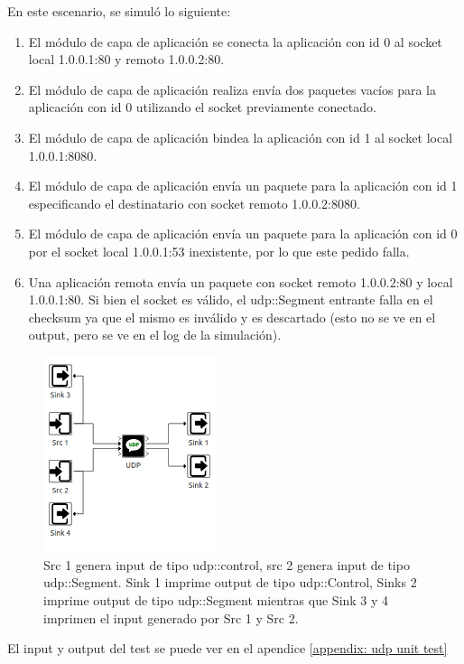 \documentclass[10pt,a4paper]{article}
\begin{document}
En este escenario, se simuló lo siguiente:
\begin{enumerate}
\item El módulo de capa de aplicación se conecta la aplicación con id 0 al socket local 1.0.0.1:80 y remoto 1.0.0.2:80.
\item El módulo de capa de aplicación realiza envía dos paquetes vacíos para la aplicación con id 0 utilizando el socket previamente conectado.
\item El módulo de capa de aplicación bindea la aplicación con id 1 al socket local 1.0.0.1:8080.
\item El módulo de capa de aplicación envía un paquete para la aplicación con id 1 especificando el destinatario con socket remoto 1.0.0.2:8080.
\item El módulo de capa de aplicación envía un paquete para la aplicación con id 0 por el socket local 1.0.0.1:53 inexistente, por lo que este pedido falla.
\item Una aplicación remota envía un paquete con socket remoto 1.0.0.2:80 y local 1.0.0.1:80. Si bien el socket es válido, el udp::Segment entrante falla en el checksum ya que el mismo es inválido y es descartado (esto no se ve en el output, pero se ve en el log de la simulación).
\end{enumerate}

\begin{figure}[!h]
    \centering
    \includegraphics[width = 0.45\textwidth]{img/png/unit_tests/udp.png}
    \caption{Src 1 genera input de tipo udp::control, src 2 genera input de tipo udp::Segment. Sink 1 imprime output de tipo udp::Control, Sinks 2 imprime output de tipo udp::Segment mientras que Sink 3 y 4 imprimen el input generado por Src 1 y Src 2.}
    \label{figure: unit test udp}
\end{figure}

El input y output del test se puede ver en el apendice \ref{appendix: udp unit test}
\end{document}
